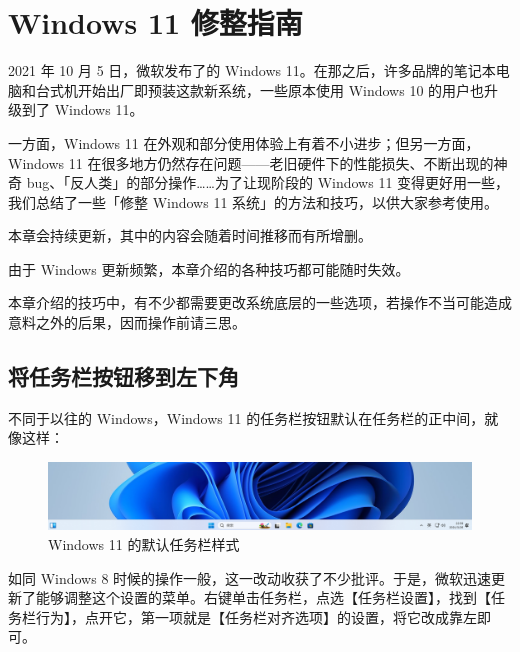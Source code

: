 \chapter{Windows 11 修整指南}
\label{cha:windows-11-optimization}

\begin{intro}
  2021 年 10 月 5 日，微软发布了的 Windows 11。在那之后，许多品牌的笔记本电脑和台式机开始出厂即预装这款新系统，一些原本使用 Windows 10 的用户也升级到了 Windows 11。

  一方面，Windows 11 在外观和部分使用体验上有着不小进步；但另一方面，Windows 11 在很多地方仍然存在问题——老旧硬件下的性能损失、不断出现的神奇 bug、「反人类」的部分操作……为了让现阶段的 Windows 11 变得更好用一些，我们总结了一些「修整 Windows 11 系统」的方法和技巧，以供大家参考使用。
\end{intro}

\begin{warning}
  本章会持续更新，其中的内容会随着时间推移而有所增删。

  由于 Windows 更新频繁，本章介绍的各种技巧都可能随时失效。
\end{warning}

\begin{danger}
  本章介绍的技巧中，有不少都需要更改系统底层的一些选项，若操作不当可能造成意料之外的后果，因而操作前请三思。
\end{danger}

\section{将任务栏按钮移到左下角}

不同于以往的 Windows，Windows 11 的任务栏按钮默认在任务栏的正中间，就像这样：

\begin{figure}[htb!]
  \centering
  \includegraphics[width=.9\textwidth]{assets/advanced/taskbar.png}
  \caption{Windows 11 的默认任务栏样式}
  \label{fig:taskbar}
\end{figure}

如同 Windows 8 时候的操作一般，这一改动收获了不少批评。于是，微软迅速更新了能够调整这个设置的菜单。右键单击任务栏，点选【任务栏设置】，找到【任务栏行为】，点开它，第一项就是【任务栏对齐选项】的设置，将它改成靠左即可。


